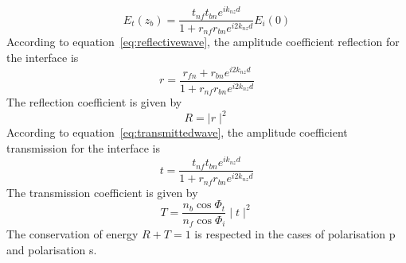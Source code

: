 \begin{equation}\label{eq:transmittedwave}
E_{t}(z_b)=\frac{t_{nf}t_{bn}e^{ik_{nz}d}}{1+r_{nf}r_{bn}e^{i2k_{nz}d}}E_i(0)
\end{equation}
According to equation~\eqref{eq:reflectivewave}, the amplitude coefficient reflection for the interface is\\
$$
r=\frac{r_{fn}+r_{bn}e^{i2k_{nz}d}}{1+r_{nf}r_{bn}e^{i2k_{nz}d}}
$$
The reflection coefficient is given by
\begin{equation*}
R=\mid r\mid^2
\end{equation*}
According to equation~\eqref{eq:transmittedwave}, the amplitude coefficient transmission for the interface is\\
$$
t=\frac{t_{nf}t_{bn}e^{ik_{nz}d}}{1+r_{nf}r_{bn}e^{i2k_{nz}d}}
$$
The transmission coefficient is given by
\begin{equation*}
T=\frac{n_b\cos\Phi _t}{n_f\cos\Phi _i}\mid t\mid^2
\end{equation*}
The conservation of energy $R+T=1$ is respected in the cases of polarisation p and polarisation s.



